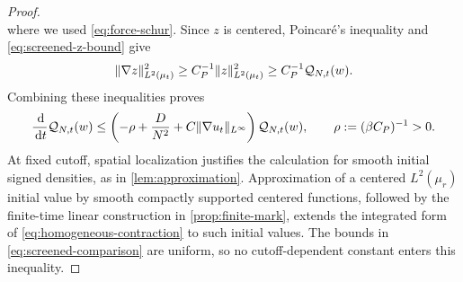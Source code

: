 \documentclass[11pt,reqno]{amsart}
\numberwithin{equation}{section}
\theoremstyle{plain}
\theoremstyle{remark}
\DeclarePairedDelimiter{\norm}{\lVert}{\rVert}
\begin{document}
\begin{proof}
\begin{equation}
\end{equation}
where we used \eqref{eq:force-schur}. Since $z$ is centered, Poincar\'e's inequality and \eqref{eq:screened-z-bound} give
\begin{equation}\label{eq:homogeneous-poincare}
 \norm{\nabla z}_{L^2(\mu_t)}^2
 \ge C_P^{-1}\norm z_{L^2(\mu_t)}^2
 \ge C_P^{-1}\mathcal Q_{N,t}(w).
\end{equation}
Combining these inequalities proves
\begin{equation}\label{eq:homogeneous-contraction}
 \frac\dd{\dd t}\mathcal Q_{N,t}(w)
 \le\left(-\rho+\frac D{N^2}+C\norm{\nabla u_t}_{L^\infty}\right)\mathcal Q_{N,t}(w),
                      \qquad\rho:=(\beta C_P)^{-1}>0.
\end{equation}
At fixed cutoff, spatial localization justifies the calculation for smooth initial signed densities, as in \cref{lem:approximation}. Approximation of a centered $L^2(\mu_r)$ initial value by smooth compactly supported centered functions, followed by the finite-time linear construction in \cref{prop:finite-mark}, extends the integrated form of \eqref{eq:homogeneous-contraction} to such initial values. The bounds in \eqref{eq:screened-comparison} are uniform, so no cutoff-dependent constant enters this inequality.


\end{proof}
\end{document}
